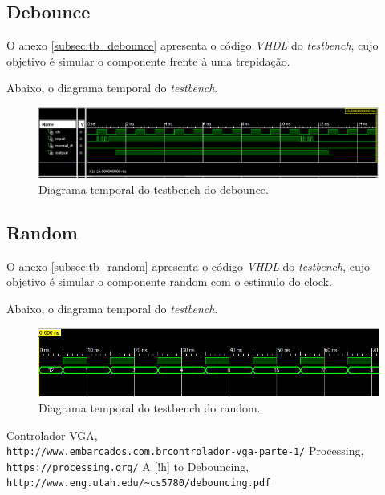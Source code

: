 \documentclass[12pt]{article}
\begin{document}
\subsection{Debounce}

O anexo \ref{subsec:tb_debounce} apresenta o código \emph{VHDL} do \emph{testbench}, cujo objetivo é simular o componente frente à uma trepidação.

Abaixo, o diagrama temporal do \emph{testbench}.

\clearpage

\begin{figure}[!h]
    \centering
    \includegraphics[width=1.0\textwidth]{img/tb_debounced_sw_NS0.png}
    \caption{Diagrama temporal do testbench do debounce.}
\end{figure}

\subsection{Random}

O anexo \ref{subsec:tb_random} apresenta o código \emph{VHDL} do \emph{testbench}, cujo objetivo é simular o componente random com o estimulo do clock.

Abaixo, o diagrama temporal do \emph{testbench}.
\begin{figure}[!h]
    \centering
    \includegraphics[width=1.0\textwidth]{img/tb_random.PNG}
    \caption{Diagrama temporal do testbench do random.}
\end{figure}


\clearpage
\begin{thebibliography}{}
Controlador VGA,
\\\texttt{http://www.embarcados.com.br\/controlador-vga-parte-1/}
Processing,
\\\texttt{https://processing.org/}
A [!h] to Debouncing,
\\\texttt{http://www.eng.utah.edu/\~{}cs5780/debouncing.pdf}
\end{thebibliography}
\end{document}
